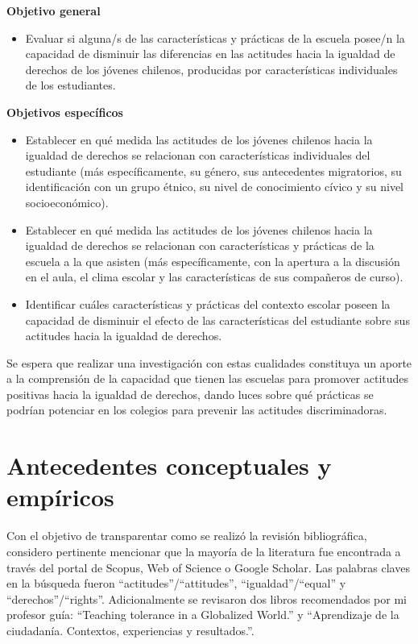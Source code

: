 \documentclass[12pt,twoside]{templates/facsothesis}
\providecommand{\tightlist}{%
  \setlength{\itemsep}{0pt}\setlength{\parskip}{0pt}}
\begin{document}
\textbf{Objetivo general}

\begin{itemize}
\tightlist
\item
  Evaluar si alguna/s de las características y prácticas de la escuela posee/n la capacidad de disminuir las diferencias en las actitudes hacia la igualdad de derechos de los jóvenes chilenos, producidas por características individuales de los estudiantes.
\end{itemize}

\textbf{Objetivos específicos}

\begin{itemize}
\tightlist
\item
  Establecer en qué medida las actitudes de los jóvenes chilenos hacia la igualdad de derechos se relacionan con características individuales del estudiante (más específicamente, su género, sus antecedentes migratorios, su identificación con un grupo étnico, su nivel de conocimiento cívico y su nivel socioeconómico).
\item
  Establecer en qué medida las actitudes de los jóvenes chilenos hacia la igualdad de derechos se relacionan con características y prácticas de la escuela a la que asisten (más específicamente, con la apertura a la discusión en el aula, el clima escolar y las características de sus compañeros de curso).
\item
  Identificar cuáles características y prácticas del contexto escolar poseen la capacidad de disminuir el efecto de las características del estudiante sobre sus actitudes hacia la igualdad de derechos.
\end{itemize}

Se espera que realizar una investigación con estas cualidades constituya un aporte a la comprensión de la capacidad que tienen las escuelas para promover actitudes positivas hacia la igualdad de derechos, dando luces sobre qué prácticas se podrían potenciar en los colegios para prevenir las actitudes discriminadoras.

\hypertarget{antecedentes-conceptuales-y-empuxedricos}{%
\chapter{Antecedentes conceptuales y empíricos}\label{antecedentes-conceptuales-y-empuxedricos}}

Con el objetivo de transparentar como se realizó la revisión bibliográfica, considero pertinente mencionar que la mayoría de la literatura fue encontrada a través del portal de Scopus, Web of Science o Google Scholar. Las palabras claves en la búsqueda fueron ``actitudes''/``attitudes'', ``igualdad''/``equal'' y ``derechos''/``rights''. Adicionalmente se revisaron dos libros recomendados por mi profesor guía: ``Teaching tolerance in a Globalized World.'' y ``Aprendizaje de la ciudadanía. Contextos, experiencias y resultados.''.
\end{document}
